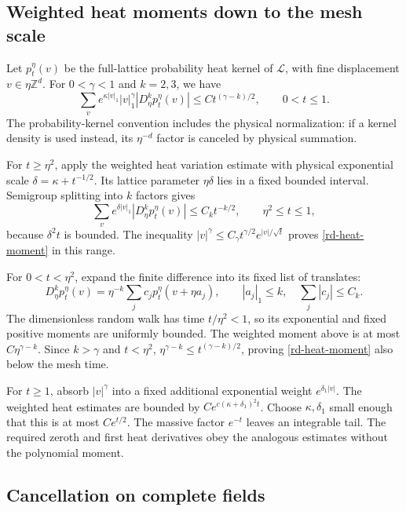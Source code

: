 \documentclass[11pt]{article}
\begin{document}
\subsection{Weighted heat moments down to the mesh scale}

Let $p_t^\eta(v)$ be the full-lattice probability heat kernel of
$\mathcal L$, with fine displacement $v\in\eta\mathbb Z^d$.
For $0<\gamma<1$ and $k=2,3$, we have
\begin{equation}\label{rd-heat-moment}
 \sum_v e^{\kappa|v|_1}|v|_1^\gamma
                   |D_\eta^kp_t^\eta(v)|
       \le Ct^{(\gamma-k)/2},\qquad0<t\le1.
\end{equation}
The probability-kernel convention includes the physical normalization:
if a kernel density is used instead, its $\eta^{-d}$ factor is
canceled by physical summation.

For $t\ge\eta^2$, apply the weighted heat variation estimate with
physical exponential scale $\delta=\kappa+t^{-1/2}$. Its lattice
parameter $\eta\delta$ lies in a fixed bounded interval. Semigroup
splitting into $k$ factors gives
\[
 \sum_v e^{\delta|v|_1}|D_\eta^kp_t^\eta(v)|
                \le C_kt^{-k/2},\qquad \eta^2\le t\le1,
\]
because $\delta^2t$ is bounded. The inequality
$|v|^\gamma\le C_\gamma t^{\gamma/2}e^{|v|/\sqrt t}$
proves \eqref{rd-heat-moment} in this range.

For $0<t<\eta^2$, expand the finite difference into its fixed list
of translates:
\[
 D_\eta^kp_t^\eta(v)
    =\eta^{-k}\sum_jc_jp_t^\eta(v+\eta a_j),
 \qquad |a_j|_1\le k,\quad\sum_j|c_j|\le C_k.
\]
The dimensionless random walk has time $t/\eta^2<1$, so its
exponential and fixed positive moments are uniformly bounded.
The weighted moment above is at most $C\eta^{\gamma-k}$.
Since $k>\gamma$ and $t<\eta^2$,
$\eta^{\gamma-k}\le t^{(\gamma-k)/2}$, proving
\eqref{rd-heat-moment} also below the mesh time.

For $t\ge1$, absorb $|v|^\gamma$ into a fixed additional
exponential weight $e^{\delta_1|v|}$. The weighted heat estimates
are bounded by $Ce^{c(\kappa+\delta_1)^2t}$. Choose
$\kappa,\delta_1$ small enough that this is at most $Ce^{t/2}$.
The massive factor $e^{-t}$ leaves an integrable tail. The required
zeroth and first heat derivatives obey the analogous estimates
without the polynomial moment.

\subsection{Cancellation on complete fields}
\end{document}
